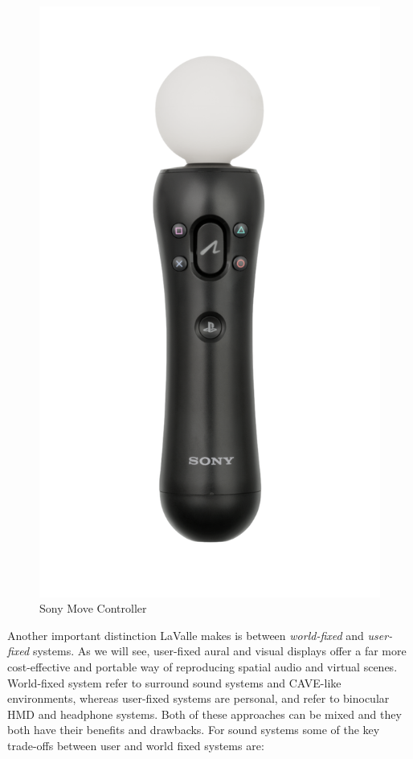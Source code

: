 \begin{figure}[!htb]
  \includegraphics[width=\linewidth]{img/sony-move.png}
  \caption{Sony Move Controller \cite{FileSony89online}}\label{fig:sony-move}
\endminipage
\end{figure}
 
Another important distinction LaValle makes is between \textit{world-fixed} and \textit{user-fixed} systems. As we will see, user-fixed aural and visual displays offer a far more cost-effective and portable way of reproducing spatial audio and virtual scenes. World-fixed system refer to surround sound systems and CAVE-like environments, whereas user-fixed systems are personal, and refer to binocular HMD and headphone systems. Both of these approaches can be mixed and they both have their benefits and drawbacks. For sound systems some of the key trade-offs between user and world fixed systems are:

